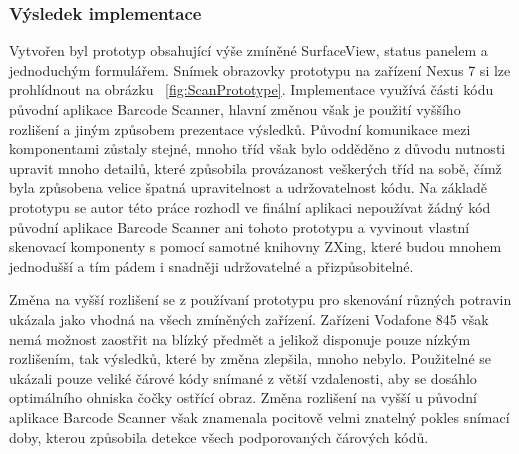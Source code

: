 \documentclass[thesis=B,czech]{FITthesis}[2013/10/20]
\begin{document}
\subsubsection{Výsledek implementace}

Vytvořen byl prototyp obsahující výše zmíněné SurfaceView, status panelem a jednoduchým formulářem. Snímek obrazovky prototypu na zařízení Nexus 7 si lze prohlídnout na obrázku  ~\ref{fig:ScanPrototype}. Implementace využívá části kódu původní aplikace Barcode Scanner, hlavní změnou však je použití vyššího rozlišení a jiným způsobem prezentace výsledků. Původní komunikace mezi komponentami zůstaly stejné, mnoho tříd však bylo odděděno z důvodu nutnosti upravit mnoho detailů, které způsobila provázanost veškerých tříd na sobě, čímž byla způsobena velice špatná upravitelnost a udržovatelnost kódu. Na základě prototypu se autor této práce rozhodl ve finální aplikaci nepoužívat žádný kód původní aplikace Barcode Scanner ani tohoto prototypu a vyvinout vlastní skenovací komponenty s pomocí samotné knihovny ZXing, které budou mnohem jednodušší a tím pádem i snadněji udržovatelné a přizpůsobitelné.

Změna na vyšší rozlišení se z používaní prototypu pro skenování různých potravin ukázala jako vhodná na všech zmíněných zařízení. Zařízeni Vodafone 845 však nemá možnost zaostřit na blízký předmět a jelikož disponuje pouze nízkým rozlišením, tak výsledků, které by změna zlepšila, mnoho nebylo. Použitelné se ukázali pouze veliké čárové kódy snímané z větší vzdalenosti, aby se dosáhlo optimálního ohniska čočky ostřící obraz. Změna rozlišení na vyšší u původní aplikace Barcode Scanner však znamenala pocitově velmi znatelný pokles snímací doby, kterou způsobila detekce všech podporovaných čárových kódů.
\end{document}
